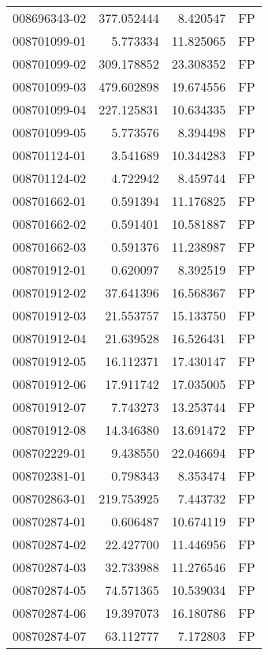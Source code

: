 \begin{tabular}{lrrl}
008696343-02 &  377.052444 &       8.420547 &   FP \\
008701099-01 &    5.773334 &      11.825065 &   FP \\
008701099-02 &  309.178852 &      23.308352 &   FP \\
008701099-03 &  479.602898 &      19.674556 &   FP \\
008701099-04 &  227.125831 &      10.634335 &   FP \\
008701099-05 &    5.773576 &       8.394498 &   FP \\
008701124-01 &    3.541689 &      10.344283 &   FP \\
008701124-02 &    4.722942 &       8.459744 &   FP \\
008701662-01 &    0.591394 &      11.176825 &   FP \\
008701662-02 &    0.591401 &      10.581887 &   FP \\
008701662-03 &    0.591376 &      11.238987 &   FP \\
008701912-01 &    0.620097 &       8.392519 &   FP \\
008701912-02 &   37.641396 &      16.568367 &   FP \\
008701912-03 &   21.553757 &      15.133750 &   FP \\
008701912-04 &   21.639528 &      16.526431 &   FP \\
008701912-05 &   16.112371 &      17.430147 &   FP \\
008701912-06 &   17.911742 &      17.035005 &   FP \\
008701912-07 &    7.743273 &      13.253744 &   FP \\
008701912-08 &   14.346380 &      13.691472 &   FP \\
008702229-01 &    9.438550 &      22.046694 &   FP \\
008702381-01 &    0.798343 &       8.353474 &   FP \\
008702863-01 &  219.753925 &       7.443732 &   FP \\
008702874-01 &    0.606487 &      10.674119 &   FP \\
008702874-02 &   22.427700 &      11.446956 &   FP \\
008702874-03 &   32.733988 &      11.276546 &   FP \\
008702874-05 &   74.571365 &      10.539034 &   FP \\
008702874-06 &   19.397073 &      16.180786 &   FP \\
008702874-07 &   63.112777 &       7.172803 &   FP \\

\end{tabular}
